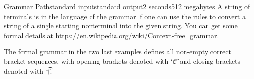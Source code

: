 \begin{problem}{Grammar Path}{standard input}{standard output}{2 seconds}{512 megabytes}
A string of terminals is in the language of the grammar if one can use the rules to convert a string of a single starting nonterminal into the given string. You can get some formal details at \url{https://en.wikipedia.org/wiki/Context-free\_grammar}. 

The formal grammar in the two last examples defines all non-empty correct bracket sequences, with opening brackets denoted with `\t{c}' and closing brackets denoted with `\t{j}'.


\Examples

\begin{example}
%
%
%
\end{example}

\end{problem}


